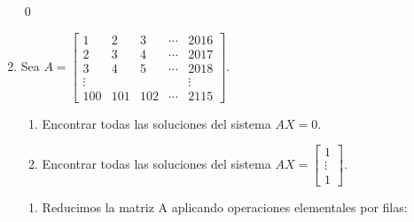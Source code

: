 \begin{enumerate}[topsep=6pt, itemsep=.4cm]
\qed

\item Sea $A=\begin{bmatrix}1 & 2 & 3 & \cdots & 2016 \\ 2 & 3 & 4 & \cdots & 2017 \\ 3&4&5& \cdots & 2018\\ \vdots & &&& \vdots \\ 100 & 101 & 102& \cdots& 2115\end{bmatrix}$.
\begin{enumerate}
   \item Encontrar todas las soluciones del sistema $AX=0$.
   \item Encontrar todas las soluciones del sistema $AX=\left[\begin{array}{c}
     1\\\vdots \\1 \end{array}\right]$.
\end{enumerate}

\rta

\begin{enumerate}
   \item Reducimos la matriz A aplicando operaciones elementales por filas:


\end{enumerate}
\end{enumerate}
